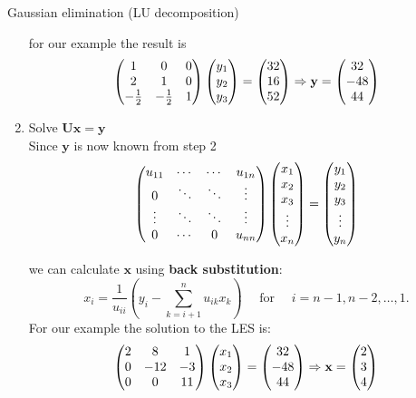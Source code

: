 \begin{vbframe}{Gaussian elimination (LU decomposition)}
\begin{enumerate}
\vspace*{-0.4cm}
\medskip
for our example the result is
\footnotesize
$$
\begin{pmatrix} 
1 & 0 & 0 \\
2 & 1 & 0 \\
-\frac{1}{2} & -\frac{1}{2} & 1  \end{pmatrix}
\begin{pmatrix} 
y_1 \\ y_2 \\ y_3
\end{pmatrix} = \begin{pmatrix}
32 \\ 16 \\ 52   \end{pmatrix} \Rightarrow
\mathbf{y} =
\begin{pmatrix} 
32 \\
-48\\
44  \end{pmatrix}
$$
\normalsize
\framebreak

\item Solve  $\mathbf{Ux} = \mathbf{y}$\\
\medskip
Since $\mathbf{y}$ is now known from step 2\\
\footnotesize
$$
\begin{pmatrix} 
u_{11}  & \cdots  & \cdots & u_{1n} \\
0       & \ddots  & \ddots & \vdots \\
\vdots  & \ddots  & \ddots  & \vdots \\
0       & \cdots  & 0       & u_{nn}  \end{pmatrix}
\begin{pmatrix} 
  x_1 \\ x_2 \\ x_3 \\ \vdots \\ x_n
  \end{pmatrix} = \begin{pmatrix}
  y_1 \\ y_2 \\ y_3 \\ \vdots \\ y_n  \end{pmatrix}
$$
\normalsize

we can calculate $\mathbf{x}$ using \textbf{back substitution}:
\footnotesize
$$
x_i = \frac{1}{u_{ii}} \left( y_i - \sum_{k = i + 1}^n u_{ik}x_k \right) \quad
  \text{ for } \quad i = n - 1, n - 2, \ldots, 1.
$$
\normalsize
For our example the solution to the LES is:
\footnotesize
$$
\begin{pmatrix} 
2 & 8 & 1 \\
0 & -12 & -3 \\
0 & 0 & 11  \end{pmatrix}
\begin{pmatrix} 
x_1 \\ x_2 \\ x_3
\end{pmatrix} = \begin{pmatrix}
32 \\ -48 \\ 44   \end{pmatrix} \Rightarrow
\mathbf{x} =
\begin{pmatrix} 
2 \\
3\\
4  \end{pmatrix}
$$
\normalsize
\end{enumerate}
\framebreak


\end{vbframe}

